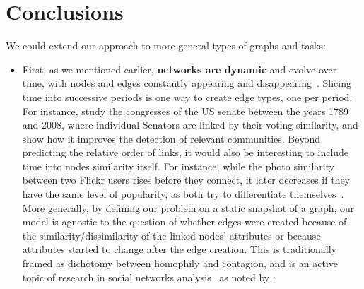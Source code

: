 \section{Conclusions}
\label{sec:edge_conc}

We could extend our approach to more general types of graphs and tasks:

\begin{itemize}[leftmargin=*]

  \item First, as we mentioned earlier, \textbf{networks are dynamic} and evolve over time, with
    nodes and edges constantly appearing and disappearing~\autocite{networkEvolution14}. Slicing
    time into successive periods is one way to create edge types, one per period. For instance,
    \textcite{TimedUSSenate10} study the  congresses of the US senate between the years 1789
    and 2008, where  individual Senators are linked by their voting similarity, and show
    how it improves the detection of relevant communities. Beyond predicting the relative order of
    links, it would also be interesting to include time into nodes similarity itself.
    For instance, while the photo similarity between two Flickr users rises before they connect, it
    later decreases if they have the same level of popularity, as both try to differentiate
    themselves~\autocite{dynamicFlickr13}.
    More generally, by defining our problem on a static snapshot of a graph, our model is agnostic
    to the question of whether edges were created because of the similarity/dissimilarity of
    the linked nodes' attributes or because attributes started to change after the edge creation.
    This is traditionally framed as dichotomy between homophily and contagion, and is an active topic
    of research in social networks analysis~\autocites{InfluenceVsHomo08}{ConfoundedHomophily11} as
    noted by \textcite{OSNreview14}: 


\end{itemize}
